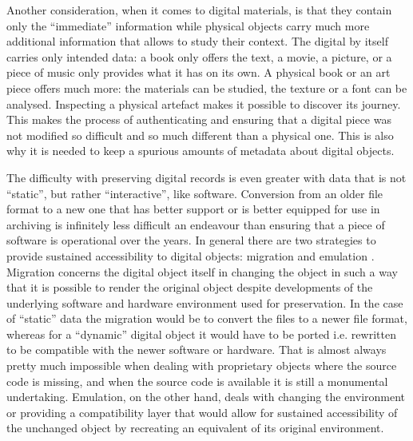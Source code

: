 Another consideration, when it comes to digital materials, is that they contain
only the ``immediate'' information while physical objects carry much more
additional information that allows to study their context. The digital by itself
carries only intended data: a book only offers the text, a movie, a picture, or
a piece of music only provides what it has on its own. A physical book or an art
piece offers much more: the materials can be studied, the texture or a font can
be analysed. Inspecting a physical artefact makes it possible to discover its
journey. This makes the process of authenticating and ensuring that a digital
piece was not modified so difficult and so much different than a physical one.
This is also why it is needed to keep a spurious amounts of metadata about
digital objects.

The difficulty with preserving digital records is even greater with data that is
not ``static'', but rather ``interactive'', like software. Conversion from an
older file format to a new one that has better support or is better equipped for
use in archiving is infinitely less difficult an endeavour than ensuring that
a piece of software is operational over the years. In general there are two
strategies to provide sustained accessibility to digital objects: migration and
emulation \cite{hoeven2007}. Migration concerns the digital object itself in
changing the object in such a way that it is possible to render the original
object despite developments of the underlying software and hardware environment
used for preservation. In the case of ``static'' data the migration would be to
convert the files to a newer file format, whereas for a ``dynamic'' digital
object it would have to be ported i.e. rewritten to be compatible with the newer
software or hardware. That is almost always pretty much impossible when dealing
with proprietary objects where the source code is missing, and when the source
code is available it is still a monumental undertaking. Emulation, on the other
hand, deals with changing the environment or providing a compatibility layer
that would allow for sustained accessibility of the unchanged object by
recreating an equivalent of its original environment.

